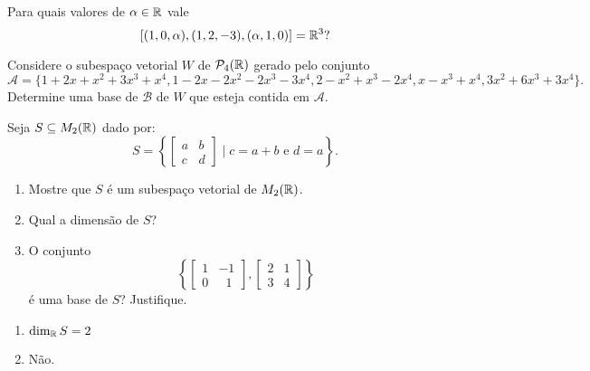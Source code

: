 \documentclass[12pt]{exam}
\begin{document}
    \begin{exercicio}
        Para quais valores de $\alpha \in \mathbb{R}$ vale
        \[
            [(1, 0, \alpha), (1, 2, -3) , (\alpha, 1, 0)] = \mathbb{R}^3?
        \]
    \end{exercicio}

    \begin{exercicio}
        Considere o subespaço vetorial $W$ de $\mathcal{P}_4(\mathbb{R})$ gerado pelo conjunto
        \[
            \mathcal{A} = \{1+2x+x^2+3x^3+x^4, 1-2x-2x^2-2x^3-3x^4,2-x^2+x^3-2x^4,x-x^3+x^4,3x^2+6x^3+3x^4\}.
        \]
        Determine uma base de $\mathcal{B}$ de $W$ que esteja contida em $\mathcal{A}$.
    \end{exercicio}

    \begin{exercicio}
        Seja $S \subseteq M_2(\mathbb{R})$ dado por:
        \[
            S = \left\{
                \begin{bmatrix}
                    a & b\\
                    c & d
                \end{bmatrix}
                \mid c = a+b \mbox{ e } d = a
            \right\}.
        \]

        \begin{enumerate}[label={\alph*})]
            \item Mostre que $S$ é um subespaço vetorial de $M_2(\mathbb{R})$.

            \item Qual a dimensão de $S$?

            \item O conjunto
                \[
                    \left\{
                        \begin{bmatrix}
                            1 & -1\\
                            0 & \phantom{x} 1
                        \end{bmatrix},
                        \begin{bmatrix}
                            2 & 1\\
                            3 & 4
                        \end{bmatrix}
                    \right\}
                \]
                é uma base de $S$? Justifique.
        \end{enumerate}

        \begin{solucao}
            \begin{enumerate}[label={\alph*})]
                \item $\dim_{\mathbb{R}} S = 2$

                \item Não.
            \end{enumerate}
        \end{solucao}
    \end{exercicio}
\end{document}
